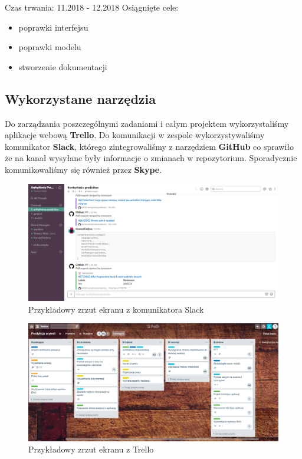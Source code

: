 \documentclass[polish,12pt]{aghthesis}
\begin{document}
Czas trwania: 11.2018 - 12.2018
\newline
Osiągnięte cele:
\begin{itemize}
	\item poprawki interfejsu
	\item poprawki modelu
	\item stworzenie dokumentacji
\end{itemize}

\subsection{Wykorzystane narzędzia}

Do zarządzania poszczególnymi zadaniami i całym projektem wykorzystaliśmy aplikacje webową \textbf{Trello}. Do komunikacji w zespole wykorzystywaliśmy komunikator \textbf{Slack}, którego zintegrowaliśmy z narzędziem \textbf{GitHub} co sprawiło że na kanał wysyłane były informacje o zmianach w repozytorium. Sporadycznie komunikowaliśmy się również przez \textbf{Skype}.

\begin{figure}[H]
	\centering
	\includegraphics[width=0.9\linewidth]{slack.png}
	\caption{Przykładowy zrzut ekranu z komunikatora Slack}
	\label{fig:slack}
\end{figure}

\begin{figure}[H]
	\centering
	\includegraphics[width=0.9\linewidth]{trello.png}
	\caption{Przykładowy zrzut ekranu z Trello}
	\label{fig:trello}
\end{figure}
\end{document}
